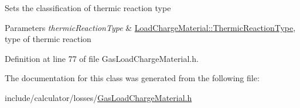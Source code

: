 Sets the classification of thermic reaction type 
\begin{DoxyParams}{Parameters}
{\em thermic\+Reaction\+Type} & \hyperlink{namespace_load_charge_material_a51d4263e865a5d86236622dd3fe23fd1}{Load\+Charge\+Material\+::\+Thermic\+Reaction\+Type}, type of thermic reaction \\
\hline
\end{DoxyParams}


Definition at line 77 of file Gas\+Load\+Charge\+Material.\+h.



The documentation for this class was generated from the following file\+:\begin{DoxyCompactItemize}
\item 
include/calculator/losses/\hyperlink{_gas_load_charge_material_8h}{Gas\+Load\+Charge\+Material.\+h}\end{DoxyCompactItemize}

